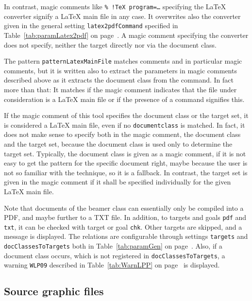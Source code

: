 In contrast, magic comments like \texttt{\%~!TeX program=\dots} 
specifying the \LaTeX{} converter signify a \LaTeX{} main file in any case. 
It overwrites also the converter 
given in the general setting \texttt{latex2pdfCommand} 
specified in Table~\ref{tab:paramLatex2pdf} on page~\pageref{tab:paramLatex2pdf}. 
A magic comment specifying the converter does not specify, 
neither the target directly nor via the document class. 


The pattern \texttt{patternLatexMainFile} matches comments and in particular magic comments, 
but it is written also to extract the parameters in magic comments described above 
as it extracts the document class from the  command. 
In fact more than that: 
It matches if the magic comment indicates 
that the file under consideration is a \LaTeX{} main file 
or if the presence of a  command signifies this. 

If the magic comment of this tool specifies the document class or the target set, 
it is considered a \LaTeX{} main file, even if no \texttt{documentclass} is matched. 
In fact, it does not make sense to specify both in the magic comment, 
the document class and the target set, 
because the document class is used only to determine the target set. 
Typically, the document class is given as a magic comment, 
if it is not easy to get the pattern for the specific document right, 
maybe because the user is not so familiar with the technique, so it is a fallback. 
In contrast, the target set is given in the magic comment 
if it shall be specified individually for the given \LaTeX{} main file. 


Note that documents of the beamer class can essentially only be compiled into a PDF, 
and maybe further to a TXT file. 
In addition, to targets and goals \texttt{pdf} and \texttt{txt}, 
it can be checked with target or goal \texttt{chk}. 
Other targets are skipped, and a message is displayed. 
The relations are configurable 
through settings \texttt{targets} and \texttt{docClassesToTargets} 
both in Table~\ref{tab:paramGen} on page~\pageref{tab:paramGen}. 
Also, if a document class occurs, 
which is not registered in \texttt{docClassesToTargets}, 
a warning \texttt{WLP09} described in Table~\ref{tab:WarnLPP} 
on page~\pageref{tab:WarnLPP} is displayed. 






\subsection{Source graphic files}\label{subsec:sourcesGraphic}

